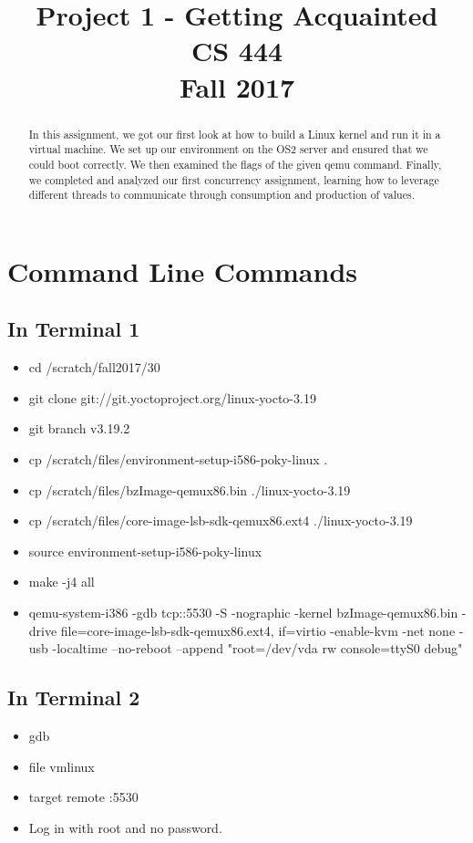 \documentclass[letterpaper,10pt]{article}
\title{Project 1 - Getting Acquainted\\CS 444\\Fall 2017}
\author{\name}
\begin{document}
\maketitle

\begin{abstract}
   In this assignment, we got our first look at how to build a Linux kernel and run it in a virtual machine.
   We set up our environment on the OS2 server and ensured that we could boot correctly.
   We then examined the flags of the given qemu command.
   Finally, we completed and analyzed our first concurrency assignment, learning how to leverage different threads to communicate through consumption and production of values.
\end{abstract}

\clearpage


\section{Command Line Commands}

\subsection{In Terminal 1}

\begin{itemize}
   \item cd /scratch/fall2017/30
   \item git clone git://git.yoctoproject.org/linux-yocto-3.19
   \item git branch v3.19.2
   \item cp /scratch/files/environment-setup-i586-poky-linux .
   \item cp /scratch/files/bzImage-qemux86.bin ./linux-yocto-3.19
   \item cp /scratch/files/core-image-lsb-sdk-qemux86.ext4 ./linux-yocto-3.19
   \item source environment-setup-i586-poky-linux
   \item make -j4 all
   \item qemu-system-i386 -gdb tcp::5530 -S -nographic -kernel bzImage-qemux86.bin -drive file=core-image-lsb-sdk-qemux86.ext4, if=virtio -enable-kvm -net none -usb -localtime --no-reboot --append "root=/dev/vda rw console=ttyS0 debug"
\end{itemize}

\subsection{In Terminal 2}
\begin{itemize}
   \item gdb
   \item file vmlinux
   \item target remote :5530
   \item Log in with root and no password.
\end{itemize}
\end{document}
